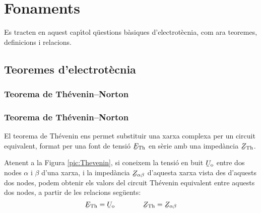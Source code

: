 \chapter{Fonaments}

Es tracten en aquest cap\'{\i}tol q\"{u}estions b\`{a}siques d'electrot\`{e}cnia, com ara teoremes, definicions
i relacions.

\section{Teoremes d'electrot\`{e}cnia}

\ifpdf
    \subsection{\texorpdfstring{Teorema de Th\'{e}venin--Norton}{Teorema de Th\'{e}venin-Norton}}
\else
    \subsection{Teorema de Th\'{e}venin--Norton}
\fi
\label{sec:T_N}

El teorema de Th\'{e}venin ens permet substituir una xarxa complexa per un circuit equivalent, format per una font de tensi\'{o} $\cmplx{E}\ped{Th}$ en s\`{e}rie amb una imped\`{a}ncia $\cmplx{Z}\ped{Th}$.

Atenent a la Figura \vref{pic:Thevenin}, si coneixem la tensi\'{o} en buit $\cmplx{U}\ped{o}$ entre dos nodes $\alpha$ i $\beta$ d'una xarxa, i la imped\`{a}ncia $\cmplx{Z}_{\alpha\beta}$ d'aquesta xarxa vista des d'aquests dos nodes, podem obtenir els valors del circuit Th\'{e}venin equivalent entre aquests dos nodes, a partir de les relacions seg\"{u}ents:
\begin{equation}
   \cmplx{E}\ped{Th} = \cmplx{U}\ped{o} \qquad\qquad  \cmplx{Z}\ped{Th} = \cmplx{Z}_{\alpha\beta}
\end{equation}

